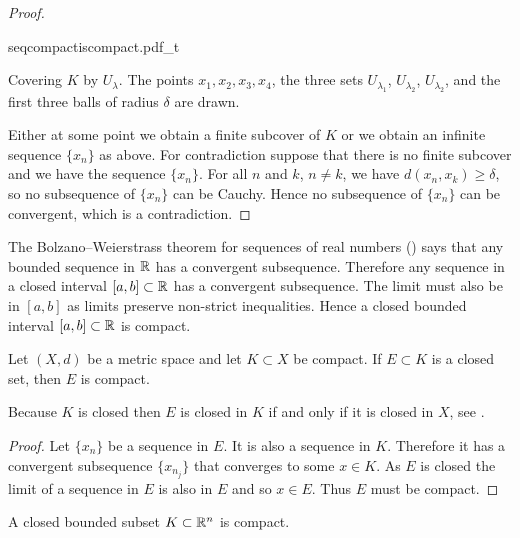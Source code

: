 \begin{proof}
\begin{myfigureht}
{seqcompactiscompact.pdf_t}
\caption{Covering $K$ by $U_{\lambda}$.  The points
$x_1,x_2,x_3,x_4$, 
the three sets 
$U_{\lambda_1}$,
$U_{\lambda_2}$,
$U_{\lambda_2}$,
and 
the first three balls
of radius $\delta$ are drawn.\label{fig:seqcompactiscompact}}
\end{myfigureht}

Either at some point we obtain a finite subcover of $K$
or we obtain an
infinite
sequence $\{ x_n \}$ as above.
For contradiction suppose that
there is no finite subcover and we have the sequence $\{ x_n \}$.
For all $n$ and $k$, $n \not= k$, 
we have $d(x_n,x_k) \geq \delta$,
so no subsequence of $\{ x_n \}$ can be
Cauchy.  Hence no subsequence of $\{ x_n \}$ can be convergent,
which is a contradiction.
\end{proof}

\begin{example}
The Bolzano--Weierstrass theorem for sequences of real numbers
()
says that any bounded sequence in ${\mathbb{R}}$ has a convergent
subsequence.  Therefore any sequence in a closed interval $[a,b] \subset {\mathbb{R}}$ has 
a convergent subsequence.  The limit must also be in $[a,b]$ as limits
preserve non-strict inequalities.  Hence a closed bounded interval $[a,b]
\subset {\mathbb{R}}$ is compact.
\end{example}

\begin{prop}
Let $(X,d)$ be a metric space and let $K \subset X$ be compact.  If
$E \subset K$ is a closed set, then $E$ is compact.
\end{prop}

Because $K$ is closed then $E$ is closed in $K$ if
and only if it is closed in $X$,
see .

\begin{proof}
Let $\{ x_n \}$ be a sequence in $E$.  It is also a sequence in $K$.
Therefore it has a convergent subsequence $\{ x_{n_j} \}$ that converges to
some $x \in K$.  As $E$ is closed the limit of a sequence in $E$ is also in $E$
and so $x \in E$.  Thus $E$ must be compact.
\end{proof}

\begin{thm}%
\label{thm:msbw}
A closed bounded subset $K \subset {\mathbb{R}}^n$ is compact.
\end{thm}

